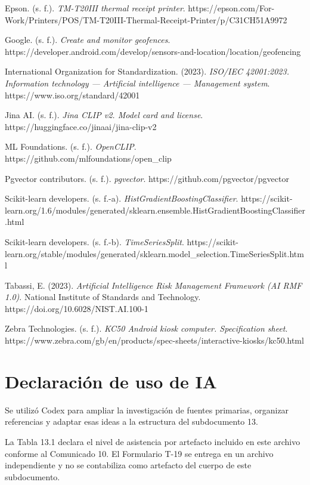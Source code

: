 \documentclass[11pt]{article}
\begin{document}
Epson. (s. f.). \emph{TM-T20III thermal receipt printer}. https://epson.com/For-Work/Printers/POS/TM-T20III-Thermal-Receipt-Printer/p/C31CH51A9972

Google. (s. f.). \emph{Create and monitor geofences}. https://developer.android.com/develop/sensors-and-location/location/geofencing

International Organization for Standardization. (2023). \emph{ISO/IEC 42001:2023. Information technology --- Artificial intelligence --- Management system}. https://www.iso.org/standard/42001

Jina AI. (s. f.). \emph{Jina CLIP v2. Model card and license}. https://huggingface.co/jinaai/jina-clip-v2

ML Foundations. (s. f.). \emph{OpenCLIP}. https://github.com/mlfoundations/open\_clip


Pgvector contributors. (s. f.). \emph{pgvector}. https://github.com/pgvector/pgvector

Scikit-learn developers. (s. f.-a). \emph{HistGradientBoostingClassifier}. https://scikit-learn.org/1.6/modules/generated/sklearn.ensemble.HistGradientBoostingClassifier.html

Scikit-learn developers. (s. f.-b). \emph{TimeSeriesSplit}. https://scikit-learn.org/stable/modules/generated/sklearn.model\_selection.TimeSeriesSplit.html

Tabassi, E. (2023). \emph{Artificial Intelligence Risk Management Framework (AI RMF 1.0)}. National Institute of Standards and Technology. https://doi.org/10.6028/NIST.AI.100-1

Zebra Technologies. (s. f.). \emph{KC50 Android kiosk computer. Specification sheet}. https://www.zebra.com/gb/en/products/spec-sheets/interactive-kiosks/kc50.html


\section*{Declaración de uso de IA}


Se utilizó Codex para ampliar la investigación de fuentes primarias, organizar referencias y adaptar esas ideas a la estructura del subdocumento 13.

La Tabla 13.1 declara el nivel de asistencia por artefacto incluido en este archivo conforme al Comunicado 10. El Formulario T-19 se entrega en un archivo independiente y no se contabiliza como artefacto del cuerpo de este subdocumento.
\end{document}
